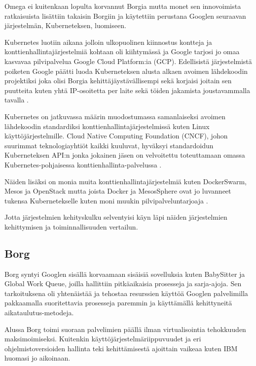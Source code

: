 \documentclass[finnish]{tktltiki2}
\theoremstyle{definition}
\theoremstyle{remark}
\begin{document}
Omega ei kuitenkaan lopulta korvannut Borgia mutta monet sen innovoimista ratkaisuista lisättiin takaisin Borgiin ja käytettiin perustana Googlen seuraavan järjestelmän, Kuberneteksen, luomiseen.

Kubernetes luotiin aikana jolloin ulkopuolinen kiinnostus kontteja ja konttienhallintajärjestelmiä kohtaan oli kiihtymässä ja Google tarjosi jo omaa kasvavaa pilvipalvelua Google Cloud Platform:ia (GCP). Edellisistä järjestelmistä poiketen Google päätti luoda Kuberneteksen alusta alkaen avoimen lähdekoodin projektiksi joka olisi Borgia kehittäjäystävällisempi sekä korjaisi joitain sen puutteita kuten yhtä IP-osoitetta per laite sekä töiden jakamista joustavammalla tavalla \cite{borg-omega-kubernetes}.

Kubernetes on jatkuvassa määrin muodostumassa samanlaiseksi avoimen lähdekoodin standardiksi konttienhallintajärjestelmissä kuten Linux käyttöjärjestelmille. Cloud Native Computing Foundation (CNCF), johon suurimmat teknologiayhtiöt kaikki kuuluvat, hyväksyi standardoidun Kuberneteksen API:n jonka jokainen jäsen on velvoitettu toteuttamaan omassa Kubernetes-pohjaisessa konttienhallinta-palvelussa \cite{kubernetes-cncf-standard-announcement}.

Näiden lisäksi on monia muita konttienhallintajärjestelmiä kuten DockerSwarm, Mesos ja OpenStack mutta joista Docker ja MesosSphere ovat jo luvanneet tukensa Kubernetekselle kuten moni muukin pilvipalveluntarjoaja \cite{practical-container}.

Jotta järjestelmien kehityskulku selventyisi käyn läpi näiden järjestelmien kehittymisen ja toiminnallisuuden vertailun.

\subsection{Borg}

Borg syntyi Googlen sisällä korvaamaan sisäisiä sovelluksia kuten BabySitter ja Global Work Queue, joilla hallittiin pitkäaikaisia prosesseja ja sarja-ajoja. Sen tarkoituksena oli yhtenäistää ja tehostaa resurssien käyttöä Googlen palvelimilla pakkaamalla suoritettavia prosesseja paremmin ja käyttämällä kehittyneitä aikataulutus-metodeja.

Alussa Borg toimi suoraan palvelimien päällä ilman virtualisointia tehokkuuden maksimoimiseksi. Kuitenkin käyttöjärjestelmäriippuvuudet ja eri ohjelmistoversioiden hallinta teki kehittämisestä ajoittain vaikeaa kuten IBM huomasi jo aikoinaan.
\end{document}
